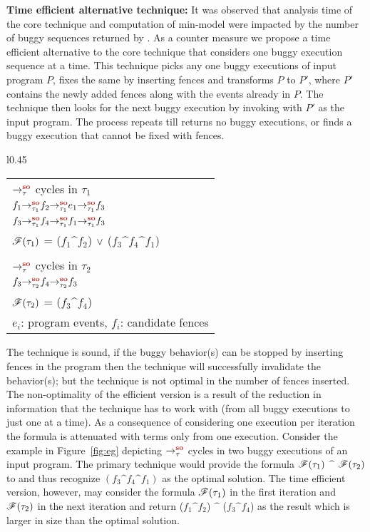 {\bf Time efficient alternative technique:} It was observed that analysis
time of the core technique and \z computation of min-model were impacted
by the number of buggy sequences returned by \cds.
%
As a counter measure we propose a time efficient alternative to the core 
technique that considers one buggy execution sequence at a time.
%
This technique picks any one buggy executions of input program $P$,
fixes the same by inserting \sc fences and  transforms $P$ to $P'$,
where $P'$ contains the newly added \sc fences along with the events already
in $P$. 
%
The technique then looks for the next buggy execution by invoking \cds 
with $P'$ as the input program. 
The process repeats till \cds returns no buggy executions, or
finds a buggy execution that cannot be fixed with \sc fences.

\begin{wrapfigure}{l}{0.45\textwidth}
	\begin{tabular}{|l|}
		\hline
		$\setSO$ cycles in $\tau_1$\\
		\tab$\so{\tau_1}{\so{\tau_1}{\so{\tau_1}{f_1}{f_2}}{e_1}}{f_3}$\\
		\tab$\so{\tau_1}{\so{\tau_1}{\so{\tau_1}{f_3}{f_4}}{f_1}}{f_3}$\\
		$\mathscr{F}(\tau_1)$ = ($f_1 \^ f_2$) $\vee$ ($f_3 \^ f_4 \^ f_1$)\\
		\\
		$\setSO$ cycles in $\tau_2$\\
		\tab$\so{\tau_2}{\so{\tau_2}{f_3}{f_4}}{f_3}$\\
		$\mathscr{F}(\tau_2)$ = ($f_3 \^ f_4$)\\
		\hline
		\multicolumn{1}{r}{\scriptsize $e_i$: program events,
					$f_i$: candidate fences}
	\end{tabular}
	\caption{example showing non-optimality of the efficient version }
	\label{fig:eg}
\end{wrapfigure}

The technique is sound, \ie if the buggy behavior(s) can be stopped by 
inserting \sc fences in the program then the technique will successfully
invalidate the behavior(s);
but the technique is not optimal in the number of fences inserted.
The non-optimality of the efficient version is a result of the reduction
in information that the technique has to work with (from all buggy executions
to just one at a time). As a consequence of considering one execution per
iteration the \z formula is attenuated with terms only from one execution.
%
Consider the example in Figure~\ref{fig:eg} depicting $\setSO$ cycles in two buggy 
executions of an input program. The primary \ourtechnique technique
would provide the formula $\mathscr{F}(\tau_1)$ $\^$ $\mathscr{F}(\tau_2)$ to 
\z and thus recognize $(f_3 \^ f_4 \^ f_1)$ as the optimal solution.
The time efficient version, however, may consider the formula 
$\mathscr{F}(\tau_1)$ in the first iteration and $\mathscr{F}(\tau_2)$ in the
next iteration and return  ($f_1 \^ f_2$) $\^$ ($f_3 \^ f_4$) as the
result which is larger in size than the optimal solution.


